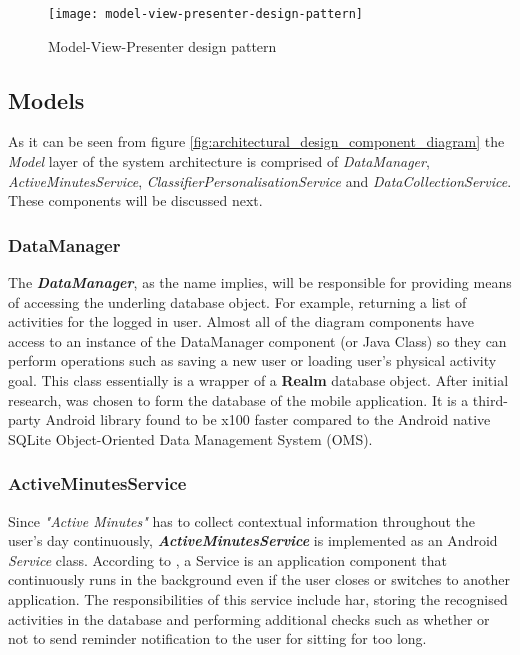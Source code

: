     \begin{figure}[ht]
        \centering
        \texttt{[image: model-view-presenter-design-pattern]}
        \caption{Model-View-Presenter design pattern \citep[28]{syromiatnikov2014}}
        \label{fig:model_view_presenter_design_pattern}
    \end{figure}
        
        \subsection{Models}
        As it can be seen from figure \ref{fig:architectural_design_component_diagram} the \textit{Model} layer of the system architecture is comprised of \textit{DataManager}, \textit{ActiveMinutesService}, \textit{ClassifierPersonalisationService} and \textit{DataCollectionService}. These components will be discussed next.
        
            \subsubsection{DataManager}
            The \textbf{\textit{DataManager}}, as the name implies, will be responsible for providing means of accessing the underling database object. For example, returning a list of activities for the logged in user. Almost all of the diagram components have access to an instance of the DataManager component (or Java Class) so they can perform operations such as saving a new user or loading user's physical activity goal. This class essentially is a wrapper of a \textbf{Realm} database object. After initial research, \citet{realm2014} was chosen to form the database of the mobile application. It is a third-party Android library found to be x100 faster compared to the Android native SQLite Object-Oriented Data Management System (OMS).
            
            \subsubsection{ActiveMinutesService}
            Since \textit{"Active Minutes"} has to collect contextual information throughout the user's day continuously, \textbf{\textit{ActiveMinutesService}} is implemented as an Android \textit{Service} class. According to \citet{googleservices2017}, a Service is an application component that continuously runs in the background even if the user closes or switches to another application. The responsibilities of this service include \gls{har}, storing the recognised activities in the database and performing additional checks such as whether or not to send reminder notification to the user for sitting for too long.
            
